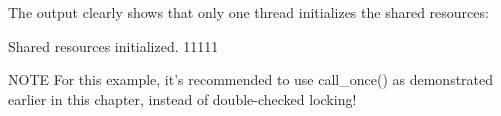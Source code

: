 The output clearly shows that only one thread initializes the shared resources:

\begin{shell}
Shared resources initialized.
11111
\end{shell}


\begin{myNotic}{NOTE}
For this example, it’s recommended to use call\_once() as demonstrated earlier in this chapter, instead of double-checked locking!
\end{myNotic}





